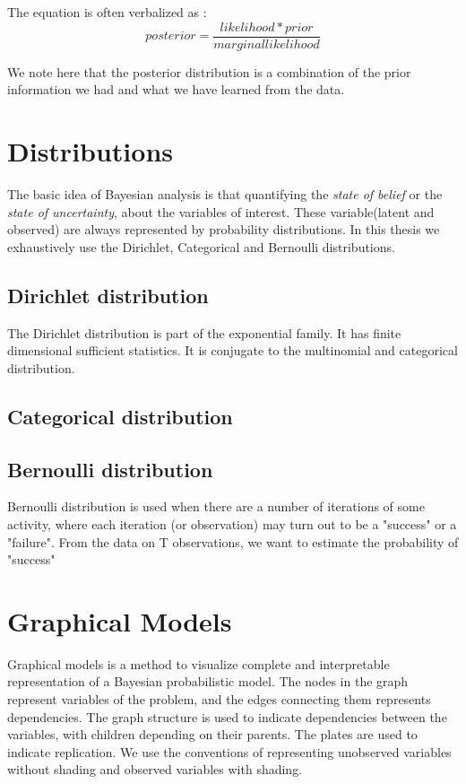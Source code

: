The equation is often verbalized as :
\begin{equation}
	posterior = \frac{likelihood * prior}{marginal likelihood}
\end{equation}

We note here that the posterior distribution is a combination of the prior information we had and what we have learned from the data. 





\section{Distributions }

The basic idea of Bayesian analysis is that quantifying the \emph{state of belief} or the \emph{state of uncertainty}, about the variables of interest. These variable(latent and observed) are always represented by probability distributions. In this thesis we exhaustively use the Dirichlet, Categorical and Bernoulli distributions. 
 
\subsection*{Dirichlet distribution}
The Dirichlet distribution is part of the exponential family. It has finite dimensional sufficient statistics. It is conjugate to the multinomial and categorical distribution. 

\subsection*{Categorical distribution}

\subsection*{Bernoulli distribution}
Bernoulli distribution is used when there are a number of iterations of some activity, where each iteration (or observation) may turn out to be a "success" or a "failure". From the data on T observations, we want to estimate the probability of "success"


\section{Graphical Models}

Graphical models is a method to visualize complete and interpretable representation of a Bayesian probabilistic model. The nodes in the graph represent variables of the problem, and the edges connecting them represents dependencies. The graph structure is used to indicate dependencies between the variables, with children depending on their parents. The plates are used to indicate replication. We use the conventions of representing unobserved variables without shading and observed variables with shading.


